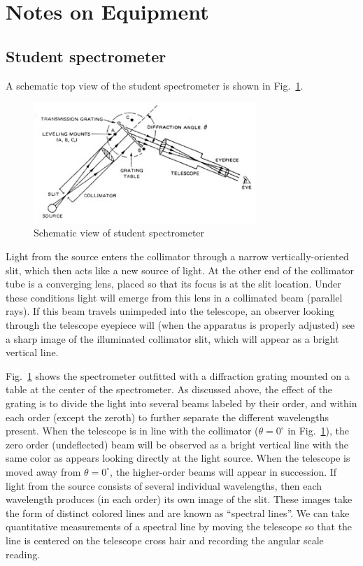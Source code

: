 \section{Notes on Equipment}

\subsection{Student spectrometer}

A schematic top view of the student spectrometer is shown in Fig.~\ref{fig:studentspec}.

\begin{figure}
\begin{centering}
\includegraphics[width=0.75\textwidth]{../images/spectrometer-top.jpg} 
\caption{Schematic view of student spectrometer}
\label{fig:studentspec}
\end{centering}
\end{figure}

Light from the source enters the collimator through a narrow
vertically-oriented slit, which then acts like a new source of light.
At the other end of the collimator tube is a converging lens, placed
so that its focus is at the slit location. Under these conditions
light will emerge from this lens in a collimated beam (parallel rays).
If this beam travels unimpeded into the telescope, an observer
looking through the telescope eyepiece will (when the apparatus is
properly adjusted) see a sharp image of the illuminated collimator
slit, which will appear as a bright vertical line.

Fig.~\ref{fig:studentspec} shows the spectrometer outfitted with a diffraction
grating mounted on a table at the center of the spectrometer. As discussed
above, the effect of the grating is to divide the light into several beams
labeled by their order, and within each order (except the zeroth) to further
separate the different wavelengths present. When the telescope is in line with
the collimator ($\theta = 0^\circ$ in Fig.~\ref{fig:studentspec}), the zero
order (undeflected) beam will be observed as a bright vertical line with the
same color as appears looking directly at the light source. When the telescope
is moved away from $\theta=0^\circ$, the higher-order beams will appear in
succession. If light from the source consists of several individual wavelengths,
then each wavelength produces (in each order) its own image of the slit. These
images take the form of distinct colored lines and are known as ``spectral
lines''. We can take quantitative measurements of a spectral line by moving the
telescope so that the line is centered on the telescope cross hair and recording
the angular scale reading.

